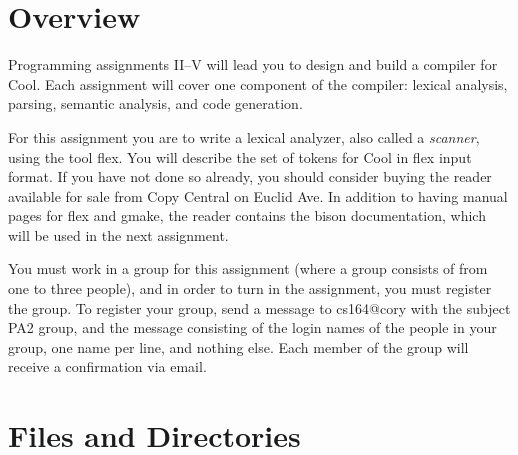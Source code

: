 %
%

%





%
\def\U#1{{\sf{}#1}}
\def\S#1{{\tt{}#1}} %
\def\C#1{{\bf{}#1}}


\section{Overview}

Programming assignments II--V will lead you to design and build a compiler
for Cool.  Each assignment will cover one component of the compiler:
lexical analysis, parsing, semantic analysis, and code generation.

For this assignment you are to write a lexical analyzer, also called a
{\em scanner}, using the tool \U{flex}.  You will describe the set of
tokens for Cool in \U{flex} input format.  If you have not done so
already, you should consider buying the reader available for sale from
Copy Central on Euclid Ave.  In addition to having manual pages for
\U{flex} and \U{gmake}, the reader contains the \U{bison} documentation,
which will be used in the next assignment.

You must work in a group for this assignment (where a group consists of
from one to three people), and in order to turn in the assignment,
you must register the group.  To register your group, send a message
to \U{cs164@cory} with the subject \U{PA2 group}, and the message consisting
of the login names of the people in your group, one name per line, and
nothing else.  Each member of the group will receive a confirmation via
email.


\section{Files and Directories}

